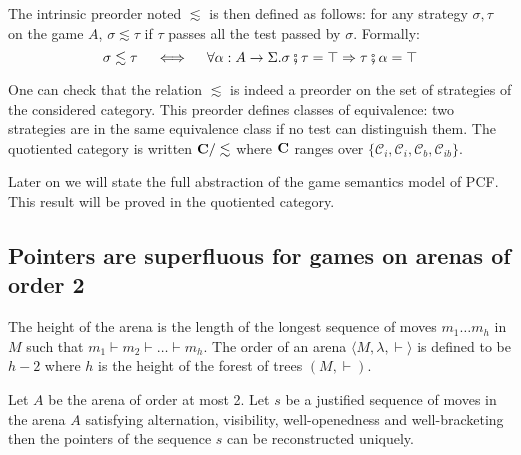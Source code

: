 The intrinsic preorder noted $\lesssim$ is then defined as follows:
for any strategy $\sigma,\tau$ on the game $A$, $\sigma \lesssim \tau$ if $\tau$ passes all the test passed by $\sigma$. Formally:
$$ \sigma \lesssim \tau \quad \iff \quad \forall \alpha : A \rightarrow \Sigma. \sigma \fatsemi \tau = \top \Rightarrow \tau \fatsemi \alpha = \top$$

One can check that the relation $\lesssim$ is indeed a preorder on the set of strategies of the considered category.
This preorder defines classes of equivalence: two strategies are in the same equivalence class if no test can distinguish them.
The quotiented category is written $\bf C/\lesssim$ where $\bf C$ ranges over $\{ \mathcal{C}_i, \mathcal{C}_i, \mathcal{C}_b, \mathcal{C}_{ib} \}$.

Later on we will state the full abstraction of the game semantics model of PCF. This result will
be proved in the quotiented category.

\subsection{Pointers are superfluous for games on arenas of order 2}
The height of the arena is the length of the longest sequence of moves
$m_1 \ldots m_h$ in $M$ such that $m_1 \vdash m_2 \vdash \ldots \vdash m_h$.
The order of an arena $\langle M, \lambda, \vdash \rangle$ is defined to be
$h-2$ where $h$ is the height of the forest of trees $(M, \vdash)$.


\begin{lem}
Let $A$ be the arena of order at most 2. Let $s$ be a justified sequence of moves in the arena $A$ satisfying
 alternation, visibility, well-openedness and well-bracketing then
the pointers of the sequence $s$ can be reconstructed uniquely.
\end{lem}



